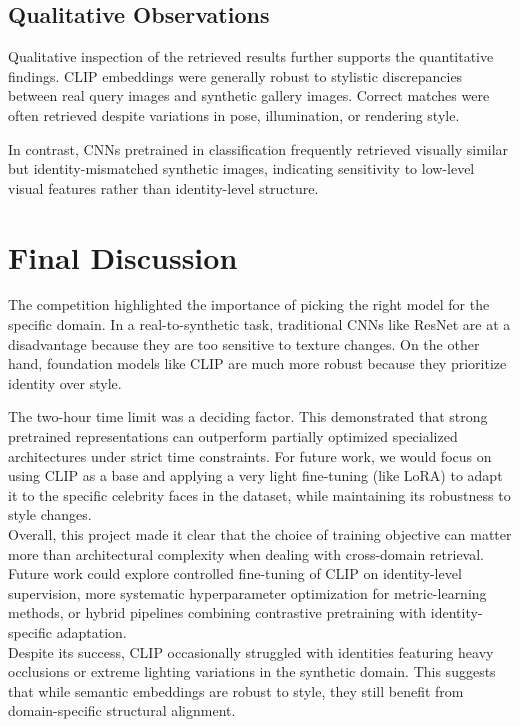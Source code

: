 \documentclass[10pt,twocolumn,letterpaper]{article}
\begin{document}
\subsection{Qualitative Observations}
Qualitative inspection of the retrieved results further supports the quantitative findings. CLIP embeddings were generally robust to stylistic discrepancies between real query images and synthetic gallery images. Correct matches were often retrieved despite variations in pose, illumination, or rendering style.

In contrast, CNNs pretrained in classification frequently retrieved visually similar but identity-mismatched synthetic images, indicating sensitivity to low-level visual features rather than identity-level structure.

\section{Final Discussion}
The competition highlighted the importance of picking the right model for the specific domain. In a real-to-synthetic task, traditional CNNs like ResNet are at a disadvantage because they are too sensitive to texture changes. On the other hand, foundation models like CLIP are much more robust because they prioritize identity over style.

The two-hour time limit was a deciding factor. This demonstrated that strong pretrained representations can outperform partially optimized specialized architectures under strict time constraints. For future work, we would focus on using CLIP as a base and applying a very light fine-tuning (like LoRA) to adapt it to the specific celebrity faces in the dataset, while maintaining its robustness to style changes.\\
Overall, this project made it clear that the choice of training objective can matter more than architectural complexity when dealing with cross-domain retrieval.\\
Future work could explore controlled fine-tuning of CLIP on identity-level supervision, more systematic hyperparameter optimization for metric-learning methods, or hybrid pipelines combining contrastive pretraining with identity-specific adaptation.\\

Despite its success, CLIP occasionally struggled with identities featuring heavy occlusions or extreme lighting variations in the synthetic domain. This suggests that while semantic embeddings are robust to style, they still benefit from domain-specific structural alignment.
\end{document}
